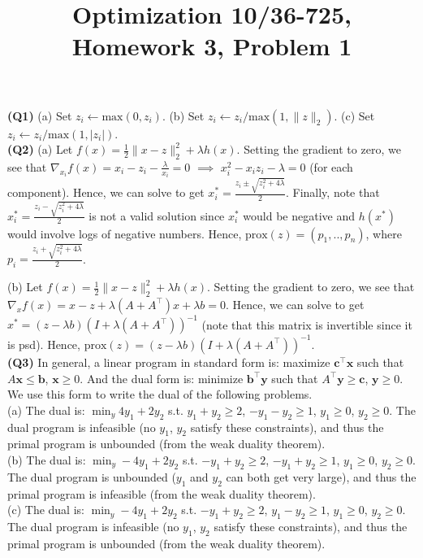 \documentclass{article}
\title{Optimization 10/36-725, 
        Homework 3, Problem 1}
\author{}
\date{}
\begin{document}
\maketitle
\vspace{-6mm}

\textbf{(Q1)}
(a) Set $z_i \leftarrow \text{max}(0,z_i)$. 
(b) Set $z_i \leftarrow z_i/\text{max}(1,\|z\|_2)$. 
(c) Set $z_i \leftarrow z_i/\text{max}(1,|z_i|)$.
\\

\textbf{(Q2)}
(a) Let $f(x) = \frac{1}{2}\|x-z\|_2^2 + \lambda h(x)$. Setting the gradient to
zero, we see that $\nabla_{x_i} f(x) = x_i - z_i - \frac{\lambda}{x_i} = 0$
$\implies$ $x_i^2 - x_i z_i - \lambda = 0$ (for each component). Hence, we can
solve to get $x_i^* = \frac{z_i \pm \sqrt{z_i^2 + 4\lambda}}{2}$. Finally, note
that $x_i^* = \frac{z_i - \sqrt{z_i^2 + 4\lambda}}{2}$ is not a valid solution
since $x_i^*$ would be negative and $h(x^*)$ would involve logs of negative
numbers.  Hence, $\text{prox}(z) = (p_1,..,p_n)$, where $p_i = \frac{z_i +
\sqrt{z_i^2 + 4\lambda}}{2}$.

(b) Let $f(x) = \frac{1}{2}\|x-z\|_2^2 + \lambda h(x)$. Setting the gradient to
zero, we see that $\nabla_{x} f(x) = x - z + \lambda(A+A^\top)x + \lambda b =
0$. Hence, we can solve to get $x^* = (z-\lambda b) (I + \lambda(A +
A^\top))^{-1}$ (note that this matrix is invertible since it is psd). Hence,
$\text{prox}(z) = (z-\lambda b) (I + \lambda(A + A^\top))^{-1}$.
\\

\textbf{(Q3)} 
In general, a linear program in standard form is: maximize
$\mathbf{c}^\top\mathbf{x}$ such that $A\mathbf{x} \leq \mathbf{b}$,
$\mathbf{x}\geq 0$. And the dual form is: minimize $\mathbf{b}^\top\mathbf{y}$
such that $A^\top\mathbf{y} \geq \mathbf{c}$, $\mathbf{y}\geq 0$. We use this 
form to write the dual of the following problems.\\
(a) The dual is:
$\min_y 4 y_1 + 2 y_2$ s.t. $y_1 + y_2 \geq 2$, $-y_1-y_2 \geq 1$, $y_1 \geq 0$, $y_2 \geq 0$.
The dual program is infeasible (no $y_1$, $y_2$ satisfy these constraints), and thus the 
primal program is unbounded (from the weak duality theorem).
\\
(b) The dual is:
$\min_y -4 y_1 + 2 y_2$ s.t. $-y_1 + y_2 \geq 2$, $-y_1+y_2 \geq 1$, $y_1 \geq 0$, $y_2 \geq 0$.
The dual program is unbounded ($y_1$ and $y_2$ can both get very large), and thus the 
primal program is infeasible (from the weak duality theorem).
\\
(c) The dual is:
$\min_y -4 y_1 + 2 y_2$ s.t. $-y_1 + y_2 \geq 2$, $y_1-y_2 \geq 1$, $y_1 \geq 0$, $y_2 \geq 0$.
The dual program is infeasible (no $y_1$, $y_2$ satisfy these constraints), and thus the 
primal program is unbounded (from the weak duality theorem).
\\
\end{document}
